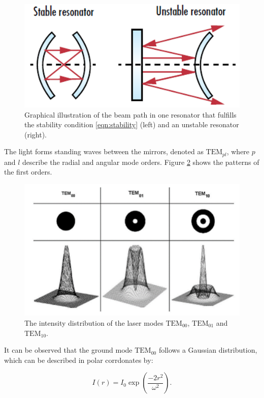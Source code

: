 \begin{figure}[H]
    \centering
    \includegraphics[scale=0.5]{pictures/resonator.png} %
    \caption{Graphical illustration of the beam path in one resonator that fulfills the stability condition \eqref{eqn:stability} (left) and an unstable resonator (right).}
    \label{fig:resonator}
\end{figure}

The light forms standing waves between the mirrors, denoted as $\text{TEM}_{pl}$,
where $p$ and $l$ describe the radial and angular mode orders. Figure 
\ref{fig:TEM} shows the patterns of the first orders.

\begin{figure}[H]
    \centering
    \includegraphics[scale=0.3]{pictures/modes.png} %
    \caption{The intensity distribution of the laser modes $\text{TEM}_{00}$, $\text{TEM}_{01}$ and $\text{TEM}_{10}$.}
    \label{fig:TEM}
\end{figure}

It can be observed that the ground mode $\text{TEM}_{00}$ follows a 
Gaussian distribution, which can be described in polar corrdonates by:

\begin{equation}
    I(r)=I_0 \exp{\left(\frac{-2r^2}{\omega^2}\right)}.
\end{equation}